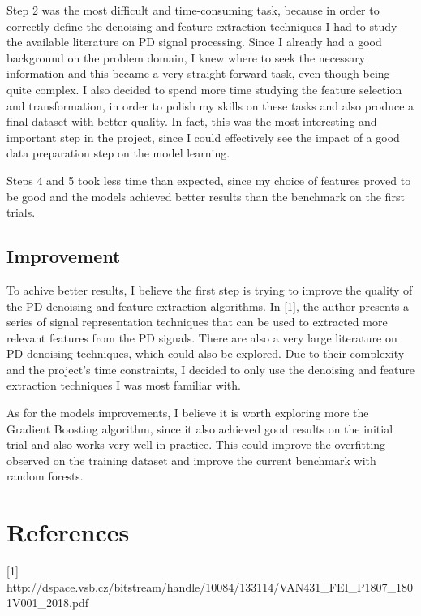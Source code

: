 \documentclass[11pt]{article}
\begin{document}
Step 2 was the most difficult and time-consuming task, because in order
to correctly define the denoising and feature extraction techniques I
had to study the available literature on PD signal processing. Since I
already had a good background on the problem domain, I knew where to
seek the necessary information and this became a very straight-forward
task, even though being quite complex. I also decided to spend more time
studying the feature selection and transformation, in order to polish my
skills on these tasks and also produce a final dataset with better
quality. In fact, this was the most interesting and important step in
the project, since I could effectively see the impact of a good data
preparation step on the model learning.

Steps 4 and 5 took less time than expected, since my choice of features
proved to be good and the models achieved better results than the
benchmark on the first trials.

\hypertarget{improvement}{%
\subsection{Improvement}\label{improvement}}

To achive better results, I believe the first step is trying to improve
the quality of the PD denoising and feature extraction algorithms. In
{[}1{]}, the author presents a series of signal representation
techniques that can be used to extracted more relevant features from the
PD signals. There are also a very large literature on PD denoising
techniques, which could also be explored. Due to their complexity and
the project's time constraints, I decided to only use the denoising and
feature extraction techniques I was most familiar with.

As for the models improvements, I believe it is worth exploring more the
Gradient Boosting algorithm, since it also achieved good results on the
initial trial and also works very well in practice. This could improve
the overfitting observed on the training dataset and improve the current
benchmark with random forests.

    \hypertarget{references}{%
\section{References}\label{references}}

{[}1{]}
http://dspace.vsb.cz/bitstream/handle/10084/133114/VAN431\_FEI\_P1807\_1801V001\_2018.pdf
\end{document}
